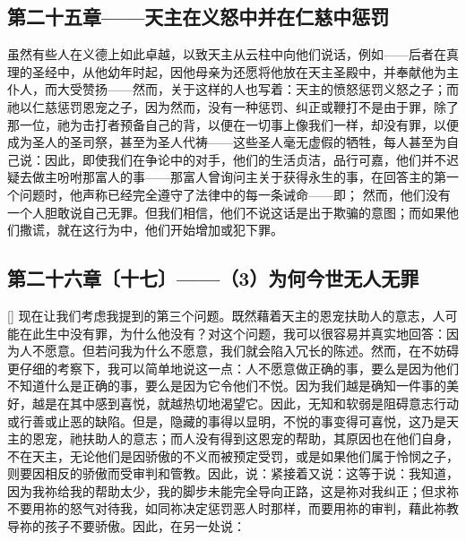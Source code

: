 
\subsection{第二十五章——天主在义怒中并在仁慈中惩罚}

虽然有些人在义德上如此卓越，以致天主从云柱中向他们说话，例如——后者在真理的圣经中，从他幼年时起，因他母亲为还愿将他放在天主圣殿中，并奉献他为主仆人，而大受赞扬——然而，关于这样的人也写着：天主的愤怒惩罚义怒之子；而祂以仁慈惩罚恩宠之子，因为然而，没有一种惩罚、纠正或鞭打不是由于罪，除了那一位，祂为击打者预备自己的背，以便在一切事上像我们一样，却没有罪，以便成为圣人的圣司祭，甚至为圣人代祷——这些圣人毫无虚假的牺牲，每人甚至为自己说：因此，即使我们在争论中的对手，他们的生活贞洁，品行可嘉，他们并不迟疑去做主吩咐那富人的事——那富人曾询问主关于获得永生的事，在回答主的第一个问题时，他声称已经完全遵守了法律中的每一条诫命——即； 然而，他们没有一个人胆敢说自己无罪。但我们相信，他们不说这话是出于欺骗的意图；而如果他们撒谎，就在这行为中，他们开始增加或犯下罪。\par


\subsection{第二十六章〔十七〕——（3）为何今世无人无罪}

[] 现在让我们考虑我提到的第三个问题。既然藉着天主的恩宠扶助人的意志，人可能在此生中没有罪，为什么他没有？对这个问题，我可以很容易并真实地回答：因为人不愿意。但若问我为什么不愿意，我们就会陷入冗长的陈述。然而，在不妨碍更仔细的考察下，我可以简单地说这一点：人不愿意做正确的事，要么是因为他们不知道什么是正确的事，要么是因为它令他们不悦。因为我们越是确知一件事的美好，越是在其中感到喜悦，就越热切地渴望它。因此，无知和软弱是阻碍意志行动或行善或止恶的缺陷。但是，隐藏的事得以显明，不悦的事变得可喜悦，这乃是天主的恩宠，祂扶助人的意志；而人没有得到这恩宠的帮助，其原因也在他们自身，不在天主，无论他们是因骄傲的不义而被预定受罚，或是如果他们属于怜悯之子，则要因相反的骄傲而受审判和管教。因此，说：紧接着又说：这等于说：我知道，因为我祢给我的帮助太少，我的脚步未能完全导向正路，这是祢对我纠正；但求祢不要用祢的怒气对待我，如同祢决定惩罚恶人时那样，而要用祢的审判，藉此祢教导祢的孩子不要骄傲。因此，在另一处说：\par


